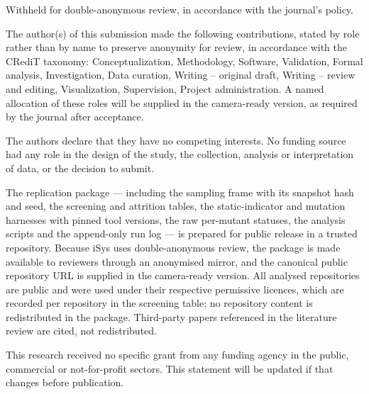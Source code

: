 \begin{declarations}

\begin{acknowledgements}
Withheld for double-anonymous review, in accordance with the journal's policy.
\end{acknowledgements}

\begin{contributions}
The author(s) of this submission made the following contributions, stated by role rather than by
name to preserve anonymity for review, in accordance with the CRediT taxonomy:
Conceptualization, Methodology, Software, Validation, Formal analysis, Investigation, Data curation,
Writing -- original draft, Writing -- review and editing, Visualization, Supervision, Project
administration. A named allocation of these roles will be supplied in the camera-ready version, as
required by the journal after acceptance.
\end{contributions}

\begin{interests}
The authors declare that they have no competing interests. No funding source had any role in the
design of the study, the collection, analysis or interpretation of data, or the decision to submit.
\end{interests}

\begin{materials}
The replication package --- including the sampling frame with its snapshot hash and seed, the
screening and attrition tables, the static-indicator and mutation harnesses with pinned tool versions,
the raw per-mutant statuses, the analysis scripts and the append-only run log --- is prepared for
public release in a trusted repository. Because iSys uses double-anonymous review, the package is
made available to reviewers through an anonymised mirror, and the canonical public repository URL is
supplied in the camera-ready version. All analysed repositories are public and were used under their
respective permissive licences, which are recorded per repository in the screening table; no
repository content is redistributed in the package. Third-party papers referenced in the literature
review are cited, not redistributed.
\end{materials}

\begin{funding}
This research received no specific grant from any funding agency in the public, commercial or
not-for-profit sectors. This statement will be updated if that changes before publication.
\end{funding}


\end{declarations}
